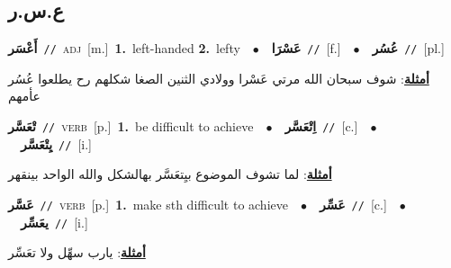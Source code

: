 \documentclass[10pt,a4paper,twoside]{article} %
\begin{document}
\begin{multicols}{2}
\vspace{-3mm}
\subsection*{\color{blue}\foreignlanguage{arabic}{ع.س.ر}\color{blue}{}} 

{\setlength\topsep{0pt}\textbf{\foreignlanguage{arabic}{أَعْسَر}}\ {\color{gray}\texttt{//}\color{black}}\ \textsc{adj}\ [m.]\ \textbf{1.}~left-handed  \textbf{2.}~lefty\ \ $\bullet$\ \ \setlength\topsep{0pt}\textbf{\foreignlanguage{arabic}{عَسْرَا}}\ {\color{gray}\texttt{//}\color{black}}\ [f.]\ \ $\bullet$\ \ \setlength\topsep{0pt}\textbf{\foreignlanguage{arabic}{عُسُر}}\ {\color{gray}\texttt{//}\color{black}}\ [pl.]\  \begin{flushright}\color{gray}\foreignlanguage{arabic}{\textbf{\underline{\foreignlanguage{arabic}{أمثلة}}}: شوف سبحان الله مرتي عَسْرا وولادي الثنين الصغا شكلهم رح يطلعوا عُسُر عأمهم}\end{flushright}\color{black}} \vspace{2mm}

{\setlength\topsep{0pt}\textbf{\foreignlanguage{arabic}{تْعَسَّر}}\ {\color{gray}\texttt{//}\color{black}}\ \textsc{verb}\ [p.]\ \textbf{1.}~be difficult to achieve\ \ $\bullet$\ \ \setlength\topsep{0pt}\textbf{\foreignlanguage{arabic}{اِتْعَسَّر}}\ {\color{gray}\texttt{//}\color{black}}\ [c.]\ \ $\bullet$\ \ \setlength\topsep{0pt}\textbf{\foreignlanguage{arabic}{يِتْعَسَّر}}\ {\color{gray}\texttt{//}\color{black}}\ [i.]\  \begin{flushright}\color{gray}\foreignlanguage{arabic}{\textbf{\underline{\foreignlanguage{arabic}{أمثلة}}}: لما تشوف الموضوع بيِتعَسَّر بهالشكل والله الواحد بينقهر}\end{flushright}\color{black}} \vspace{2mm}

{\setlength\topsep{0pt}\textbf{\foreignlanguage{arabic}{عَسَّر}}\ {\color{gray}\texttt{//}\color{black}}\ \textsc{verb}\ [p.]\ \textbf{1.}~make sth difficult to achieve\ \ $\bullet$\ \ \setlength\topsep{0pt}\textbf{\foreignlanguage{arabic}{عَسِّر}}\ {\color{gray}\texttt{//}\color{black}}\ [c.]\ \ $\bullet$\ \ \setlength\topsep{0pt}\textbf{\foreignlanguage{arabic}{يعَسِّر}}\ {\color{gray}\texttt{//}\color{black}}\ [i.]\  \begin{flushright}\color{gray}\foreignlanguage{arabic}{\textbf{\underline{\foreignlanguage{arabic}{أمثلة}}}: يارب سهِّل ولا تعَسِّر}\end{flushright}\color{black}} \vspace{2mm}


\end{multicols}
\end{document}
